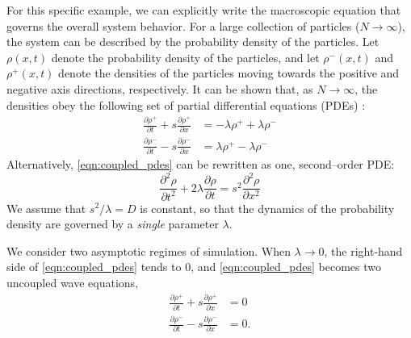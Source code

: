 \documentclass[prl, reprint, final, showkeys]{revtex4-1}
\begin{document}
For this specific example, we can explicitly write the macroscopic equation that governs the overall system behavior.
%
For a large collection of particles ($N \rightarrow \infty$), the system can be described by the probability density of the particles.
%
Let $\rho(x, t)$ denote the probability density of the particles, and let $\rho^-(x, t)$ and $\rho^+(x, t)$ denote the densities of the particles moving towards the positive and negative axis directions, respectively.
%
It can be shown that, as $N \rightarrow \infty$, the densities obey the following set of partial differential equations (PDEs) \cite{othmer2000diffusion}:
\begin{equation} \label{eqn:coupled_pdes}
\begin{aligned}
\frac{\partial \rho^+}{\partial t} + s \frac{\partial \rho^+}{\partial x} & = -\lambda \rho^+ +\lambda \rho^- \\
\frac{\partial \rho^-}{\partial t} - s \frac{\partial \rho^-}{\partial x} & = \lambda \rho^+ -\lambda \rho^- 
\end{aligned}
\end{equation}
%
Alternatively, \eqref{eqn:coupled_pdes} can be rewritten as one, second--order PDE:
\begin{equation} \label{eq:second_order_pde}
\frac{\partial^2 \rho}{\partial t^2} + 2 \lambda \frac{\partial \rho}{\partial t} = s^2 \frac{\partial ^2 \rho}{\partial x^2}
\end{equation}
%
We assume that $s^2/\lambda = D$ is constant, so that the dynamics of the probability density are governed by a {\em single} parameter $\lambda$.


We consider two asymptotic regimes of simulation.
%
When $\lambda \rightarrow 0$, the right-hand side of \eqref{eqn:coupled_pdes} tends to 0, and \eqref{eqn:coupled_pdes} becomes two uncoupled wave equations,
\begin{equation}
\begin{aligned}
\frac{\partial \rho^+}{\partial t} + s \frac{\partial \rho^+}{\partial x} & = 0 \\
\frac{\partial \rho^-}{\partial t} - s \frac{\partial \rho^-}{\partial x} & = 0.
\end{aligned}
\end{equation}
\end{document}
